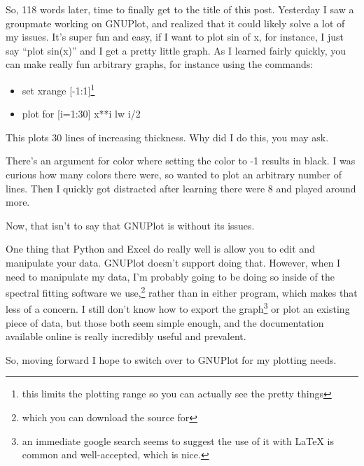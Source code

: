 \documentclass[12pt]{article}[titlepage]
\newcommand{\say}[1]{``#1''}
\newcommand{\1}{\={a}}
\newcommand{\2}{\={e}}
\newcommand{\3}{\={\i}}
\newcommand{\4}{\=o}
\newcommand{\5}{\=u}
\newcommand{\6}{\={A}}
\renewcommand{\,}{\textsuperscript{,}}
\begin{document}
So, 118 words later, time to finally get to the title of this post.
Yesterday I saw a groupmate working on GNUPlot, and realized that it could likely solve a lot of my issues.
It's super fun and easy, if I want to plot sin of x, for instance, I just say \say{plot sin(x)} and I get a pretty little graph.
As I learned fairly quickly, you can make really fun arbitrary graphs, for instance using the commands:
\begin{itemize}
\item set xrange [-1:1]\footnote{this limits the plotting range so you can actually see the pretty things}
\item plot for [i=1:30] x**i lw i/2
\end{itemize}
This plots 30 lines of increasing thickness.
Why did I do this, you may ask.

There's an argument for color where setting the color to -1 results in black.
I was curious how many colors there were, so wanted to plot an arbitrary number of lines.
Then I quickly got distracted after learning there were 8 and played around more.

Now, that isn't to say that GNUPlot is without its issues.

One thing that Python and Excel do really well is allow you to edit and manipulate your data.
GNUPlot doesn't support doing that.
However, when I need to manipulate my data, I'm probably going to be doing so inside of the spectral fitting software we use,\footnote{which you can download the source for} rather than in either program, which makes that less of a concern.
I still don't know how to export the graph\footnote{an immediate google search seems to suggest the use of it with LaTeX is common and well-accepted, which is nice.} or plot an existing piece of data, but those both seem simple enough, and the documentation available online is really incredibly useful and prevalent.

So, moving forward I hope to switch over to GNUPlot for my plotting needs.
\end{document}
